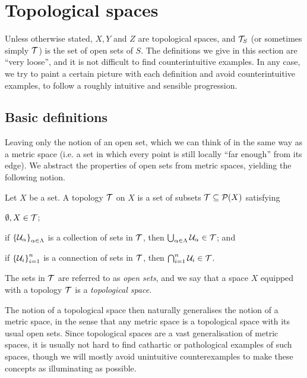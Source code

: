 \documentclass[11pt]{article}
\begin{document}
\section{Topological spaces}
Unless otherwise stated, $X, Y$ and $Z$ are topological spaces, and $\mathcal{T}_S$ (or sometimes simply $\mathcal{T}$) is the set of open sets of $S$. The definitions we give in this section are ``very loose'', and it is not difficult to find counterintuitive examples. In any case, we try to paint a certain picture with each definition and avoid counterintuitive examples, to follow a roughly intuitive and sensible progression.
\subsection{Basic definitions}
Leaving only the notion of an open set, which we can think of in the same way as a metric space (i.e. a set in which every point is still locally ``far enough'' from its edge). We abstract the properties of open sets from metric spaces, yielding the following notion.
\begin{definition}
    Let $X$ be a set. A topology $\mathcal{T}$ on $X$ is a set of subsets $\mathcal{T} \subseteq \mathcal{P}(X)$ satisfying
    \begin{enum}
        \item $\emptyset, X \in \mathcal{T}$;
        \item if $\left\{  \mathcal{U}_\alpha  \right\}_{\alpha \in \Lambda}$ is a collection of sets in $\mathcal{T}$, then $\bigcup_{\alpha \in \Lambda} \mathcal{U}_\alpha \in \mathcal{T}$; and
        \item if $\left\{  \mathcal{U}_i  \right\}_{i = 1}^n$ is a connection of sets in $\mathcal{T}$, then $\bigcap_{i = 1}^n \mathcal{U}_i \in \mathcal{T}$.
    \end{enum}
    The sets in $\mathcal{T}$ are referred to as \emph{open sets}, and we say that a space $X$ equipped with a topology $\mathcal{T}$ is a \emph{topological space}.
\end{definition}
The notion of a topological space then naturally generalises the notion of a metric space, in the sense that any metric space is a topological space with its usual open sets. Since topological spaces are a vast generalisation of metric spaces, it is usually not hard to find cathartic or pathological examples of such spaces, though we will mostly avoid unintuitive counterexamples to make these concepts as illuminating as possible.
\end{document}
